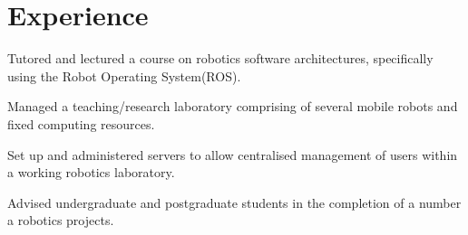 \documentclass[a4paper]{awesome-deedy}
\begin{document}
\begin{minipage}[t]{0.66\textwidth} 


\section{Experience}

\vspace{\topsep} %
\begin{tightemize}
\item Tutored and lectured a course on robotics software architectures, specifically using the Robot Operating System(ROS).
\item Managed a teaching/research laboratory comprising of several mobile robots and fixed computing resources.
\item Set up and administered servers to allow centralised management of users within a working robotics laboratory.
\item Advised undergraduate and postgraduate students in the completion of a number a robotics projects.
\end{tightemize}
\sectionsep


\end{minipage}
\end{document}
